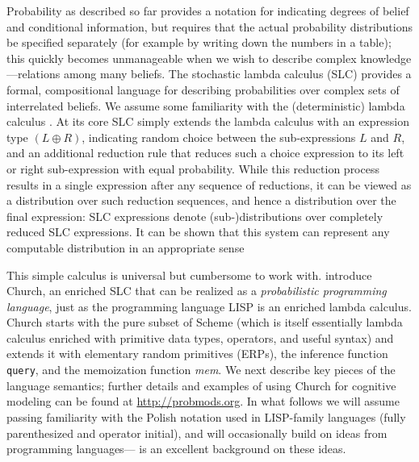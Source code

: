 \documentclass[pdfextras]{handbook}
\begin{document}
Probability as described so far provides a notation for indicating degrees of belief and conditional information, but requires that the actual probability distributions be specified separately (for example by writing down the numbers in a table); this quickly becomes unmanageable when we wish to describe complex knowledge---relations among many beliefs. 
The stochastic lambda calculus (SLC) provides a formal, compositional language for describing probabilities over complex sets of interrelated beliefs. 
We assume some familiarity with the (deterministic) lambda calculus \citep{barendregt1985lambda,hindley1986introduction}. 
At its core SLC simply extends the lambda calculus with an expression type $(L \oplus R)$, indicating random choice between the sub-expressions $L$ and $R$, and an additional reduction rule that reduces such a choice expression to its left or right sub-expression with equal probability. 
While this reduction process results in a single expression after any sequence of reductions, it can be viewed as a distribution over such reduction sequences, and hence a distribution over the final expression: SLC expressions denote (sub-)distributions over completely reduced SLC expressions. 
It can be shown that this system can represent any computable distribution in an appropriate sense \cite[see for example][]{ramsey2002stochastic,freer2012computable}

This simple calculus is universal but cumbersome to work with. 
\citet{goodman08} introduce Church, an enriched SLC that can be realized as a \emph{probabilistic programming language}, just as the programming language LISP is an enriched lambda calculus. 
Church starts with the pure subset of Scheme (which is itself essentially lambda calculus enriched with primitive data types, operators, and useful syntax) and extends it with elementary random primitives (ERPs), the inference function \lstinline{query}, and the memoization function \emph{mem}. 
We next describe key pieces of the language semantics; further details and examples of using Church for cognitive modeling can be found at \url{http://probmods.org}.
In what follows we will assume passing familiarity with the Polish notation used in LISP-family languages (fully parenthesized and operator initial), and will occasionally build on ideas from programming languages---\cite{abelson1983structure} is an excellent background on these ideas. 
\end{document}

